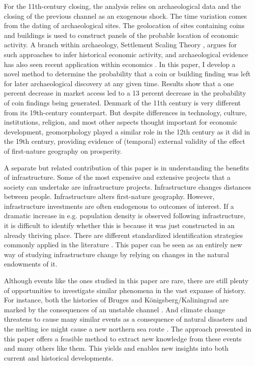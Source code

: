 \documentclass[11pt]{article}
\begin{document}
For the 11th-century closing, the analysis relies on archaeological data and the closing of the previous channel as an exogenous shock. The time variation comes from the dating of archaeological sites. The geolocation of sites containing coins and buildings is used to construct panels of the probable location of economic activity. A branch within archaeology, Settlement Scaling Theory \citep{Ortman2020}, argues for such approaches to infer historical economic activity, and archaeological evidence has also seen recent application within economics \citep{Davis2002, Barjamovic2019, Bakker2021Phonecians, Allen2023}. In this paper, I develop a novel method to determine the probability that a coin or building finding was left for later archaeological discovery at any given time. Results show that a one percent decrease in market access led to a 13 percent decrease in the probability of coin findings being generated. Denmark of the 11th century is very different from its 19th-century counterpart. But despite differences in technology, culture, institutions, religion, and most other aspects thought important for economic development, geomorphology played a similar role in the 12th century as it did in the 19th century, providing evidence of (temporal) external validity of the effect of first-nature geography on prosperity.

A separate but related contribution of this paper is in understanding the benefits of infrastructure. Some of the most expensive and extensive projects that a society can undertake are infrastructure projects. Infrastructure changes distances between people. Infrastructure alters first-nature geography. However, infrastructure investments are often endogenous to outcomes of interest.  If a dramatic increase in e.g. population density is observed following infrastructure, it is difficult to identify whether this is because it was just constructed in an already thriving place. There are different standardized identification strategies commonly applied in the literature \citep{Redding2015}. This paper can be seen as an entirely new way of studying infrastructure change by relying on changes in the natural endowments of it.

Although events like the ones studied in this paper are rare, there are still plenty of opportunities to investigate similar phenomena in the vast expanse of history. For instance, both the histories of Bruges and Königsberg/Kaliningrad are marked by the consequences of an unstable channel \citep{Houtte1966, Charlier2011, Britannica2018}. And climate change threatens to cause many similar events as a consequence of natural disasters \citep{IPCC2022} and the melting ice might cause a new northern sea route \citep{Bekker2018NothernSeaRoute}. The approach presented in this paper offers a feasible method to extract new knowledge from these events and many others like them. This yields and enables new insights into both current and historical developments. 
\end{document}
